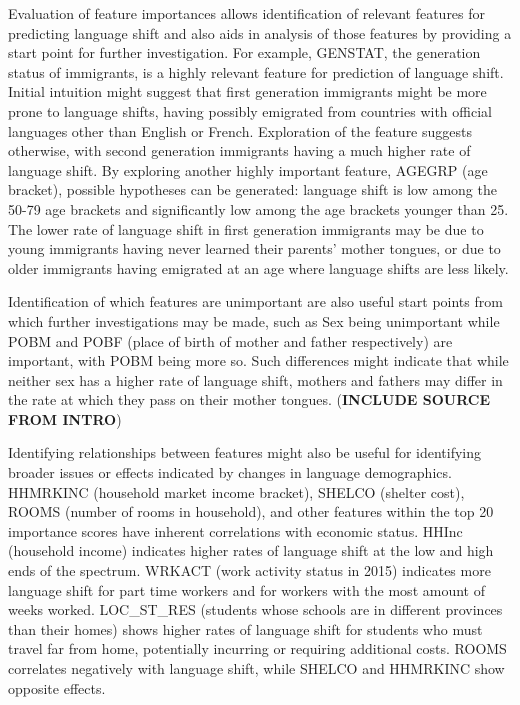 \documentclass[10pt, conference, compsocconf]{IEEEtran}
\begin{document}
Evaluation of feature importances allows identification of relevant features for predicting language shift and also aids in analysis of those features by providing a start point for further investigation.  For example, GENSTAT, the generation status of immigrants, is a highly relevant feature for prediction of language shift.  Initial intuition might suggest that first generation immigrants might be more prone to language shifts, having possibly emigrated from countries with official languages other than English or French.  Exploration of the feature suggests otherwise, with second generation immigrants having a much higher rate of language shift.  By exploring another highly important feature, AGEGRP (age bracket), possible hypotheses can be generated: language shift is low among the 50-79 age brackets and significantly low among the age brackets younger than 25.  The lower rate of language shift in first generation immigrants may be due to young immigrants having never learned their parents' mother tongues, or due to older immigrants having emigrated at an age where language shifts are less likely.

Identification of which features are unimportant are also useful start points from which further investigations may be made, such as Sex being unimportant while POBM and POBF (place of birth of mother and father respectively) are important, with POBM being more so.  Such differences might indicate that while neither sex has a higher rate of language shift, mothers and fathers may differ in the rate at which they pass on their mother tongues.  (\textbf{INCLUDE SOURCE FROM INTRO})

Identifying relationships between features might also be useful for identifying broader issues or effects indicated by changes in language demographics.  HHMRKINC (household market income bracket), SHELCO (shelter cost), ROOMS (number of rooms in household), and other features within the top 20 importance scores have inherent correlations with economic status.  HHInc (household income) indicates higher rates of language shift at the low and high ends of the spectrum.  WRKACT (work activity status in 2015) indicates more language shift for part time workers and for workers with the most amount of weeks worked.   LOC\_ST\_RES (students whose schools are in different provinces than their homes) shows higher rates of language shift for students who must travel far from home, potentially incurring or requiring additional costs.  ROOMS correlates negatively with language shift, while SHELCO and HHMRKINC show opposite effects.
\end{document}
